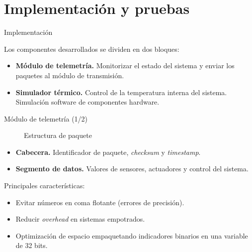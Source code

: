 \section{Implementación y pruebas}


\begin{frame}{Implementación}

Los componentes desarrollados se dividen en dos bloques:

\begin{itemize}[<+->]
\item \textbf{Módulo de telemetría.} Monitorizar el estado del sistema y enviar los paquetes al módulo de transmisión.
\item \textbf{Simulador térmico.} Control de la temperatura interna del sistema. Simulación software de componentes hardware.
\end{itemize}

\end{frame}


\begin{frame}{Módulo de telemetría (1/2)}

\begin{figure}[h]
\centering
\resizebox{0.7\textwidth}{!}
{
}
\caption{Estructura de paquete}
\end{figure}

\begin{itemize}
\item \textbf{Cabecera.} Identificador de paquete, \emph{checksum} y \emph{timestamp}.
\item \textbf{Segmento de datos.} Valores de sensores, actuadores y control del sistema.
\end{itemize}


Principales características:

\begin{itemize}
\item Evitar números en coma flotante (errores de precisión).
\item Reducir \emph{overhead} en sistemas empotrados.
\item Optimización de espacio empaquetando indicadores binarios en una variable de 32 bits.
\end{itemize}

\end{frame}



